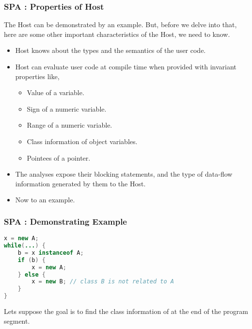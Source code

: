 \begin{frame}
  \frametitle{SPA : Properties of Host}
    The Host can be demonstrated by an example. But, before we delve into that, here are some other important characteristics of the Host, we need to know.

    \begin{itemize}
        \item<2-> Host knows about the types and the semantics of the user code.

        \item<3-> Host can evaluate user code at compile time when provided with invariant properties like,
            \begin{itemize}
                \item Value of a variable.
                \item Sign of a numeric variable.
                \item Range of a numeric variable.
                \item Class information of object variables.
                \item Pointees of a pointer.
            \end{itemize}

        \item<4-> The analyses expose their blocking statements, and the type of data-flow information generated by them to the Host.

        \item<5-> Now to an example.
    \end{itemize}

\end{frame}


\begin{frame}[fragile]
  \frametitle{SPA : Demonstrating Example}

\begin{lstlisting}[language=Java, captionpos=t, frame=leftline, caption={Program with Loop}, label={lst:spaex1}]
x = new A;
while(...) {
    b = x instanceof A;
    if (b) {
        x = new A;
    } else {
        x = new B; // class B is not related to A
    }
}\end{lstlisting}

    Lets suppose the goal is to find the class information of  at the end of the program segment.

\end{frame}


